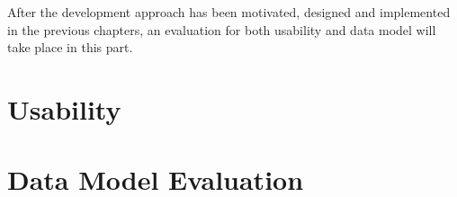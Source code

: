 After the development approach has been motivated, designed and implemented in the previous chapters, an evaluation for both usability and data model  will take place in this part.


\section{Usability} \label{sec:eval-usability}


\section{Data Model Evaluation}


% 




